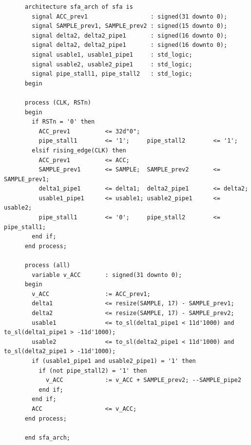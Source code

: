 \begin{table}[t!]
\begin{minipage}[t][16cm][t]{\linewidth}
\begin{verbatim}
      architecture sfa_arch of sfa is
        signal ACC_prev1                  : signed(31 downto 0);
        signal SAMPLE_prev1, SAMPLE_prev2 : signed(15 downto 0);
        signal delta2, delta2_pipe1       : signed(16 downto 0);
        signal delta2, delta2_pipe1       : signed(16 downto 0);
        signal usable1, usable1_pipe1     : std_logic;
        signal usable2, usable2_pipe1     : std_logic;
        signal pipe_stall1, pipe_stall2   : std_logic;
      begin
      
      process (CLK, RSTn)
      begin
        if RSTn = '0' then
          ACC_prev1          <= 32d"0";
          pipe_stall1        <= '1';     pipe_stall2        <= '1';
        elsif rising_edge(CLK) then
          ACC_prev1          <= ACC;
          SAMPLE_prev1       <= SAMPLE;  SAMPLE_prev2       <= SAMPLE_prev1;
          delta1_pipe1       <= delta1;  delta2_pipe1       <= delta2;
          usable1_pipe1      <= usable1; usable2_pipe1      <= usable2;
          pipe_stall1        <= '0';     pipe_stall2        <= pipe_stall1;
        end if;
      end process;
      
      process (all)
        variable v_ACC       : signed(31 downto 0);
      begin
        v_ACC                := ACC_prev1;
        delta1               <= resize(SAMPLE, 17) - SAMPLE_prev1;
        delta2               <= resize(SAMPLE, 17) - SAMPLE_prev2;
        usable1              <= to_sl(delta1_pipe1 < 11d'1000) and to_sl(delta1_pipe1 > -11d'1000);
        usable2              <= to_sl(delta2_pipe1 < 11d'1000) and to_sl(delta2_pipe1 > -11d'1000);
        if (usable1_pipe1 and usable2_pipe1) = '1' then
          if (not pipe_stall2) = '1' then
            v_ACC            := v_ACC + SAMPLE_prev2; --SAMPLE_pipe2
          end if;
        end if;
        ACC                  <= v_ACC;
      end process;
      
      end sfa_arch;
    \end{verbatim}
    \label{fig:FP_Compare_Graph}
  \end{minipage}
\end{table}

